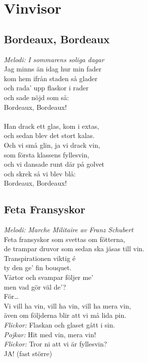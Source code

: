 \chapter{Vinvisor}
\section{Bordeaux, Bordeaux}
\textit{Melodi: I sommarens soliga dagar}
\vspace{2mm}\\
Jag minns än idag hur min fader\\
kom hem ifrån staden så glader\\
och rada’ upp flaskor i rader\\
och sade nöjd som så:\\
Bordeaux, Bordeaux!\\
\\
Han drack ett glas, kom i extas,\\
och sedan blev det stort kalas.\\
Och vi små glin, ja vi drack vin,\\
som första klassens fyllesvin,\\
och vi dansade runt där på golvet\\
och skrek så vi blev blå:\\
Bordeaux, Bordeaux!\\

\section{Feta Fransyskor}
\textit{Melodi: Marche Militaire av Franz Schubert}
\vspace{2mm}\\
Feta fransyskor som svettas om fötterna,\\
de trampar druvor som sedan ska jäsas till vin.\\
Transpirationen viktig é\\
ty den ge’ fin bouquet.\\
Vårtor och svampar följer me’\\
men vad gör väl de’?\\
För…\\
Vi vill ha vin, vill ha vin, vill ha mera vin,\\
även om följderna blir att vi må lida pin.\\
\textit{Flickor:} Flaskan och glaset gått i sin.\\
\textit{Pojkar:} Hit med vin, mera vin!\\
\textit{Flickor:} Tror ni att vi är fyllesvin?\\
JA! (fast större)\\


